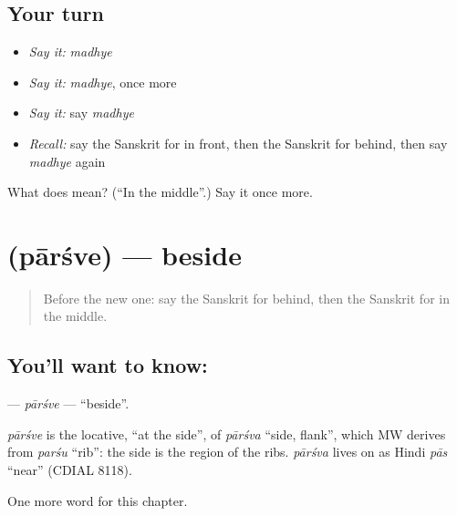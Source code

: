 \subsection*{Your turn}
\begin{itemize}
\raggedright
  \item \emph{Say it:} \emph{madhye}
  \item \emph{Say it:} \emph{madhye}, once more
  \item \emph{Say it:} say \emph{madhye}
  \item \emph{Recall:} say the Sanskrit for in front, then the Sanskrit for behind, then say \emph{madhye} again
\end{itemize}

\begin{tcolorbox}[breakable,colback=teal!4,colframe=teal!35!black,title={Before you move on}]
What does  mean? (\textquotedblleft{}In the middle\textquotedblright{}.) Say it once more.
\end{tcolorbox}
\section[\texorpdfstring{\sk{पार्श्वे} (pārśve)}{पार्श्वे (pārśve)}]{ (pārśve) — beside}

\label{lesson:SA-C95-parsve}



\begin{quote}
Before the new one: say the Sanskrit for behind, then the Sanskrit for in the middle.
\end{quote}

\subsection*{You'll want to know: }
\textbf{} — \emph{pārśve} — \textquotedblleft{}beside\textquotedblright{}.

\begin{cousinweb}
\emph{pārśve} is the locative, \textquotedblleft{}at the side\textquotedblright{}, of \emph{pārśva} \textquotedblleft{}side, flank\textquotedblright{}, which MW derives from \emph{parśu} \textquotedblleft{}rib\textquotedblright{}: the side is the region of the ribs. \emph{pārśva} lives on as Hindi \emph{pās} \textquotedblleft{}near\textquotedblright{} (CDIAL 8118).
\end{cousinweb}

\begin{grammarlens}[title={What you've built}]
One more word for this chapter.
\end{grammarlens}

